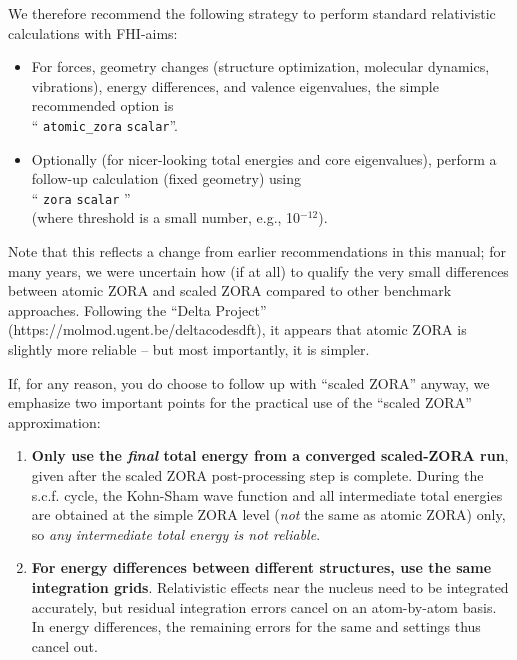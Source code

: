 We therefore recommend the following strategy to perform standard
relativistic calculations with FHI-aims:
\begin{itemize}
  \item For forces, geometry changes
    (structure optimization, molecular dynamics, vibrations), energy
    differences, and valence eigenvalues, the simple recommended
    option is \\ `` \texttt{atomic\_zora} 
    \texttt{scalar}''. 
  \item Optionally (for nicer-looking total energies and core
    eigenvalues), perform a follow-up calculation (fixed geometry)
    using \\ `` \texttt{zora} 
    \texttt{scalar} '' \\ (where threshold is a small
    number, e.g., 10$^{-12}$).
\end{itemize}
Note that this reflects a change from earlier recommendations in this
manual; for many years, we were uncertain how (if at all) to qualify
the very small differences between atomic ZORA and scaled ZORA
compared to other benchmark approaches. Following the ``Delta
Project'' (https://molmod.ugent.be/deltacodesdft), it appears that
atomic ZORA is slightly more reliable -- but most importantly, it is
simpler. 

If, for any reason, you do choose to follow up with ``scaled ZORA''
anyway, we emphasize two important points for the practical use of the
``scaled ZORA'' approximation:
\begin{enumerate}
  \item \textbf{Only use the \emph{final} total energy from a converged
    scaled-ZORA run}, given after the scaled ZORA post-processing step
    is complete. During the s.c.f. cycle, the Kohn-Sham wave function
    and all intermediate total energies are obtained at the simple
    ZORA level (\emph{not} the same as atomic ZORA) only, so \emph{any
      intermediate total energy is not reliable}. 
  \item \textbf{For energy differences between different structures,
    use the same  integration
    grids}. Relativistic effects near the nucleus need to be
    integrated accurately, but residual integration errors cancel on
    an atom-by-atom basis. In energy differences, the remaining errors
    for the same  and
     settings thus cancel out.
\end{enumerate}

